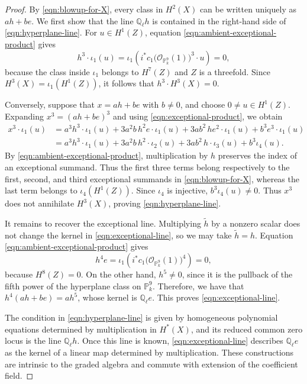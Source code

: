 \documentclass[10pt,a4paper]{amsart}
\newcommand\OO{\mathcal{O}}
\newcommand\PP{\mathbb{P}}
\newcommand\QQ{\mathbb{Q}}
\begin{document}
\begin{proof}
By \eqref{eqn:blowup-for-X}, every class in $H^2(X)$ can be written
uniquely as $ah+be$.  We first show that the line $\QQ_\ell h$ is
contained in the right-hand side of \eqref{eqn:hyperplane-line}.  For
$u\in H^1(Z)$, equation \eqref{eqn:ambient-exceptional-product} gives
\[
h^3\cdot\iota_1(u)
=
\iota_1\left(
i^*c_1\bigl(\OO_{\PP^9_k}(1)\bigr)^3\cdot u
\right)
=
0,
\]
because the class inside $\iota_1$ belongs to $H^7(Z)$ and $Z$ is a
threefold.  Since $H^3(X)=\iota_1(H^1(Z))$, it follows that
$h^3\cdot H^3(X)=0$.

Conversely, suppose that $x=ah+be$ with $b\neq0$, and choose
$0\neq u\in H^1(Z)$.  
Expanding $x^3=(ah+be)^3$ and using
\eqref{eqn:exceptional-product}, we obtain
\[
\begin{aligned}
x^3\cdot\iota_1(u)
&=
a^3h^3\cdot\iota_1(u)
+3a^2b\,h^2e\cdot\iota_1(u)
+3ab^2\,he^2\cdot\iota_1(u)
+b^3e^3\cdot\iota_1(u)
\\
&=
a^3h^3\cdot\iota_1(u)
+3a^2b\,h^2\cdot\iota_2(u)
+3ab^2\,h\cdot\iota_3(u)
+b^3\iota_4(u).
\end{aligned}
\]
By \eqref{eqn:ambient-exceptional-product}, multiplication by $h$
preserves the index of an exceptional summand.  Thus the first three
terms belong respectively to the first, second, and third exceptional
summands in \eqref{eqn:blowup-for-X}, whereas the last term belongs to
$\iota_4(H^1(Z))$.  
Since $\iota_4$ is injective,
$b^3\iota_4(u)\neq0$.  Thus $x^3$ does not annihilate $H^3(X)$, proving
\eqref{eqn:hyperplane-line}.

It remains to recover the exceptional line.  Multiplying
$\widetilde h$ by a nonzero scalar does not change the kernel in
\eqref{eqn:exceptional-line}, so we may take $\widetilde h=h$.  Equation
\eqref{eqn:ambient-exceptional-product} gives
\[
h^4e
=
\iota_1\left(
i^*c_1\bigl(\OO_{\PP^9_k}(1)\bigr)^4
\right)
=
0,
\]
because $H^8(Z)=0$.  On the other hand, $h^5\neq0$, since it is the
pullback of the fifth power of the hyperplane class on $\PP^9_k$.
Therefore, we have that $h^4(ah+be)=ah^5$, whose kernel is $\QQ_\ell e$.  This proves
\eqref{eqn:exceptional-line}.

The condition in \eqref{eqn:hyperplane-line} is given by homogeneous
polynomial equations determined by multiplication in $H^*(X)$, and its
reduced common zero locus is the line $\QQ_\ell h$.  Once this line is
known, \eqref{eqn:exceptional-line} describes $\QQ_\ell e$ as the
kernel of a linear map determined by multiplication.  These
constructions are intrinsic to the graded algebra and commute with
extension of the coefficient field.
\end{proof}
\end{document}
